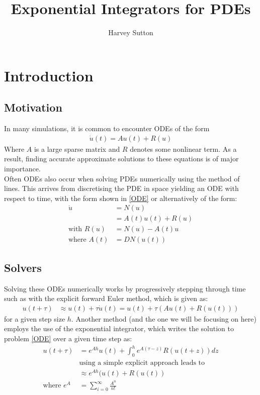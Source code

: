 \documentclass{article}
\begin{document}
\title{Exponential Integrators for PDEs} 
\maketitle
\author{Harvey Sutton}

\tableofcontents
\newpage

\section {Introduction}
\subsection{Motivation}
In many simulations, it is common to encounter ODEs of the form
\begin{align}
\dot u(t) = Au(t) + R(u) \label{ODE}
\end{align}
Where $A$ is a large sparse matrix and $R$ denotes some nonlinear term.
As a result, finding accurate approximate solutions to these equations is of major importance.\\

Often ODEs also occur when solving PDEs numerically using the method of lines.
This arrives from discretising the PDE in space yielding an ODE with respect to time, with the form shown in \eqref{ODE} or alternatively of the form:\\
\begin{align*}
\dot u &= N(u)\\
&= A(t)u(t) + R(u)\\
\text{with } R(u)&=N(u)-A(t)u\\
\text{where } A(t) &= DN(u(t))
\end{align*}
\subsection{Solvers}
Solving these ODEs numerically works by progressively stepping through time such as with the explicit forward Euler method, which is given as:
\begin{align*}
u(t+\tau) &\approx u(t) + \tau\dot u(t) = u(t) + \tau(Au(t) + R(u(t)))
\end{align*}
for a given step size $h$.
Another method (and the one we will be focusing on here) employs the use of the exponential integrator, which writes the solution to problem \eqref{ODE} over a given time step as:
\begin{align*}
u(t+\tau) &= e^{Ah}u(t) + \int_0^h e^{A(\tau-z)}R(u(t+z)) dz \label{ODE Solution}\\
&\text{using a simple explicit approach leads to}\\
&\approx e^{Ah}(u(t) + R(u(t))\\
\text{where } e^{A} &= \sum^{\infty}_{i = 0}\frac{A^n}{n!}
\end{align*}
\end{document}
